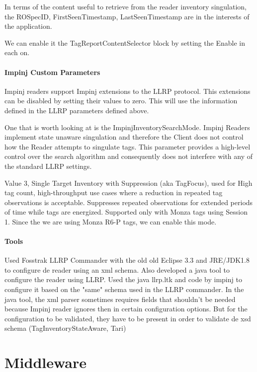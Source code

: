 In terms of the content useful to retrieve from the reader inventory singulation, the ROSpecID, FirstSeenTimestamp, LastSeenTimestamp are in the interests of the application.

We can enable it the TagReportContentSelector block by setting the Enable in each on.

\paragraph{Impinj Custom Parameters}

Impinj readers support Impinj extensions to the LLRP protocol. This extensions can be disabled by setting their values to zero. This will use the information defined in the LLRP parameters defined above.

One that is worth looking at is the ImpinjInventorySearchMode.
Impinj Readers implement state unaware singulation and therefore the Client does not control how the Reader attempts to singulate tags. This parameter provides a high-level control over the search algorithm and consequently does not interfere with any of the standard LLRP settings.~\cite[sec. 4.3.3]{ImpinjOctaneLLRP}

Value 3, Single Target Inventory with Suppression (aka TagFocus), used for High tag count, high-throughput use cases where a reduction in repeated tag observations is acceptable. Suppresses repeated observations for extended periods of time while tags are energized. Supported only with Monza tags using Session 1. Since the we are using Monza R6-P tags, we can enable this mode.

\paragraph{Tools}

Used Fosstrak LLRP Commander with the old old Eclipse 3.3 and JRE/JDK1.8 to configure de reader using an xml schema.
Also developed a java tool to configure the reader using LLRP. Used the java llrp.ltk and code by impinj to configure it based on the "same" schema used in the LLRP commander.
In the java tool, the xml parser sometimes requires fields that shouldn't be needed because Impinj reader ignores then in certain configuration options. But for the configuration to be validated, they have to be present in order to validate de xsd schema (TagInventoryStateAware, Tari)

\section{Middleware}

